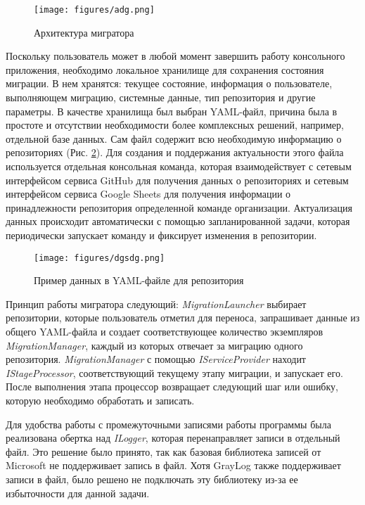 \begin{figure}[H]
  \centering
  \texttt{[image: figures/adg.png]}
  \caption{Архитектура мигратора}
  \label{2}
\end{figure}

Поскольку пользователь может в любой момент завершить работу консольного приложения, необходимо локальное хранилище для сохранения состояния миграции. В нем хранятся: текущее состояние, информация о пользователе, выполняющем миграцию, системные данные, тип репозитория и другие параметры. В качестве хранилища был выбран YAML-файл, причина была в простоте и отсутствии необходимости более комплексных решений, например, отдельной базе данных. Сам файл содержит всю необходимую информацию о репозиториях (Рис. \ref{3}). Для создания и поддержания актуальности этого файла используется отдельная консольная команда, которая взаимодействует с сетевым интерфейсом сервиса GitHub для получения данных о репозиториях и сетевым интерфейсом сервиса Google Sheets для получения информации о принадлежности репозитория определенной команде организации. Актуализация данных происходит автоматически с помощью запланированной задачи, которая периодически запускает команду и фиксирует изменения в репозитории.

\begin{figure}[H]
  \centering
  \texttt{[image: figures/dgsdg.png]}
  \caption{Пример данных в YAML-файле для репозитория}
  \label{3}
\end{figure}

Принцип работы мигратора следующий: \emph{MigrationLauncher} выбирает репозитории, которые пользователь отметил для переноса, запрашивает данные из общего YAML-файла и создает соответствующее количество экземпляров \emph{MigrationManager}, каждый из которых отвечает за миграцию одного репозитория. \emph{MigrationManager} с помощью \emph{IServiceProvider} находит \emph{IStageProcessor}, соответствующий текущему этапу миграции, и запускает его. После выполнения этапа процессор возвращает следующий шаг или ошибку, которую необходимо обработать и записать.

Для удобства работы с промежуточными записями работы программы была реализована обертка над \emph{ILogger}, которая перенаправляет записи в отдельный файл. Это решение было принято, так как базовая библиотека записей от Microsoft не поддерживает запись в файл. Хотя GrayLog \cite{graylog} также поддерживает записи в файл, было решено не подключать эту библиотеку из-за ее избыточности для данной задачи.

